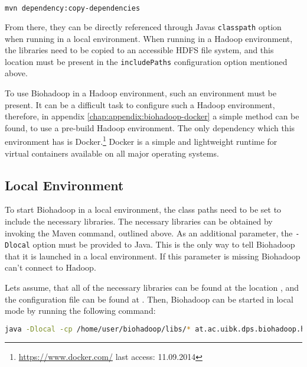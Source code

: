 \begin{lstlisting}[language=bash]
mvn dependency:copy-dependencies
\end{lstlisting}

From there, they can be directly referenced through Javas \texttt{classpath} option when running in a local environment. When running in a Hadoop environment, the libraries need to be copied to an accessible HDFS file system, and this location must be present in the \texttt{includePaths} configuration option mentioned above.

To use Biohadoop in a Hadoop environment, such an environment must be present. It can be a difficult task to configure such a Hadoop environment, therefore, in appendix \ref{chap:appendix:biohadoop-docker} a simple method can be found, to use a pre-build Hadoop environment. The only dependency which this environment has is Docker.\footnote{\url{https://www.docker.com/} last access: 11.09.2014} Docker is a simple and lightweight runtime for virtual containers available on all major operating systems.

\subsection{Local Environment}
\label{chap:usage:local}
To start Biohadoop in a local environment, the class paths need to be set to include the necessary libraries. The necessary libraries can be obtained by invoking the Maven command, outlined above. As an additional parameter, the \texttt{-Dlocal} option must be provided to Java. This is the only way to tell Biohadoop that it is launched in a local environment. If this parameter is missing Biohadoop can't connect to Hadoop.

Lets assume, that all of the necessary libraries can be found at the location , and the configuration file can be found at . Then, Biohadoop can be started in local mode by running the following command:
  
\begin{lstlisting}[language=bash]
java -Dlocal -cp /home/user/biohadoop/libs/* at.ac.uibk.dps.biohadoop.hadoop.BiohadoopApplicationMaster /home/user/biohadoop/configs/simple-config-json
\end{lstlisting}

